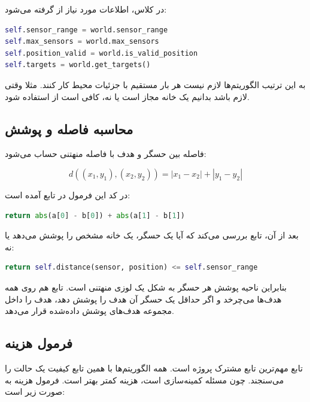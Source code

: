 \documentclass[10.5pt]{exam}
\begin{document}
در کلاس، اطلاعات مورد نیاز از
گرفته می‌شود:

\begin{latin}
\begin{lstlisting}[language=Python]
self.sensor_range = world.sensor_range
self.max_sensors = world.max_sensors
self.position_valid = world.is_valid_position
self.targets = world.get_targets()
\end{lstlisting}
\end{latin}

به این ترتیب الگوریتم‌ها لازم نیست هر بار مستقیم با جزئیات محیط کار کنند. مثلا وقتی لازم باشد بدانیم یک خانه مجاز است یا نه، کافی است از
استفاده شود.

\subsection{محاسبه فاصله و پوشش}
فاصله بین حسگر و هدف با فاصله منهتنی حساب می‌شود:

\[
    d((x_1,y_1),(x_2,y_2)) = |x_1-x_2| + |y_1-y_2|
\]

در کد این فرمول در تابع
آمده است:

\begin{latin}
\begin{lstlisting}[language=Python]
return abs(a[0] - b[0]) + abs(a[1] - b[1])
\end{lstlisting}
\end{latin}

بعد از آن، تابع
بررسی می‌کند که آیا یک حسگر، یک خانه مشخص را پوشش می‌دهد یا نه:

\begin{latin}
\begin{lstlisting}[language=Python]
return self.distance(sensor, position) <= self.sensor_range
\end{lstlisting}
\end{latin}

بنابراین ناحیه پوشش هر حسگر به شکل یک لوزی منهتنی است. تابع
هم روی همه هدف‌ها می‌چرخد و اگر حداقل یک حسگر آن هدف را پوشش دهد، هدف را داخل مجموعه هدف‌های پوشش داده‌شده قرار می‌دهد.

\subsection{فرمول هزینه}
تابع
مهم‌ترین تابع مشترک پروژه است. همه الگوریتم‌ها با همین تابع کیفیت یک حالت را می‌سنجند. چون مسئله کمینه‌سازی است، هزینه کمتر بهتر است. فرمول هزینه به صورت زیر است:
\end{document}
